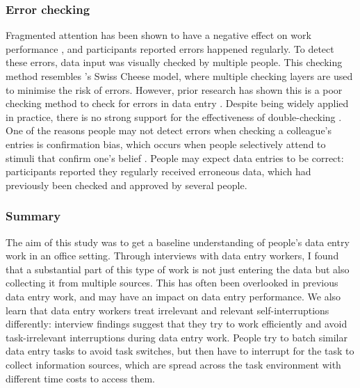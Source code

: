 \subsubsection{Error checking}
Fragmented attention has been shown to have a negative effect on work performance \citep{Bailey2001, Carrier2015}, and participants reported errors happened regularly. To detect these errors, data input was visually checked by multiple people. This checking method resembles \citeauthor{Reason1990}'s \citeyearpar{Reason1990}  Swiss Cheese model, where multiple checking layers are used to minimise the risk of errors. However, prior research has shown this is a poor checking method to check for errors in data entry \citep{Olsen2008, Wiseman2013a}. Despite being widely applied in practice, there is no strong support for the effectiveness of double-checking \citep{Li2016}. One of the reasons people may not detect errors when checking a colleague's entries is confirmation bias, which occurs when people selectively attend to stimuli that confirm one's belief \citep{Lewis1986}. People may expect data entries to be correct: participants reported they regularly received erroneous data, which had previously been checked and approved by several people. 


\subsubsection{Summary}
The aim of this study was to get a baseline understanding of people's data entry work in an office setting. Through interviews with data entry workers, I found that a substantial part of this type of work is not just entering the data but also collecting it from multiple sources. This has often been overlooked in previous data entry work, and may have an impact on data entry performance. We also learn that data entry workers treat irrelevant and relevant self-interruptions differently: interview findings suggest that they try to work efficiently and avoid task-irrelevant interruptions during data entry work. People try to batch similar data entry tasks to avoid task switches, but then have to interrupt for the task to collect information sources, which are spread across the task environment with different time costs to access them. 

